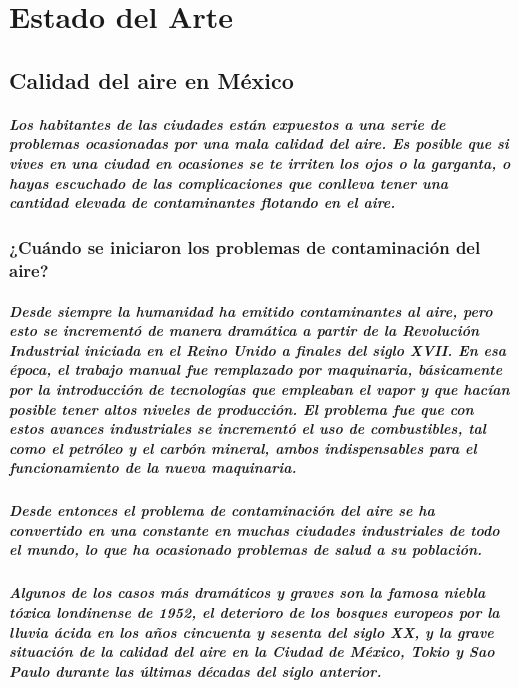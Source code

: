 \chapter {Estado del Arte}
  \section {Calidad del aire en México}
    \paragraph {Los habitantes de las ciudades están expuestos a una serie de problemas ocasionadas por una mala calidad del aire. Es posible que si vives en una ciudad en  ocasiones se te irriten los ojos o la garganta, o hayas escuchado de las complicaciones que conlleva tener una cantidad elevada de contaminantes flotando en el aire.}

    \subsection{¿Cuándo se iniciaron los problemas de contaminación del aire?}
    \paragraph {Desde siempre la humanidad ha emitido contaminantes al aire, pero esto se incrementó de manera dramática a partir de la Revolución Industrial iniciada en el Reino Unido a finales del siglo XVII. En esa época, el trabajo manual fue remplazado por maquinaria, básicamente por la introducción de tecnologías que empleaban el vapor y que hacían posible tener altos niveles de producción. El problema fue que con estos avances industriales se incrementó el  uso de combustibles, tal como el petróleo y el carbón mineral, ambos indispensables para el funcionamiento de la nueva maquinaria.}

    \paragraph {Desde entonces el problema de contaminación del aire se ha convertido en una constante en muchas ciudades industriales de todo el mundo, lo que ha ocasionado problemas de salud a su población.}

    \paragraph {Algunos de los casos más dramáticos y graves son la famosa niebla tóxica londinense de 1952, el deterioro de los bosques europeos por la lluvia ácida en los años cincuenta y sesenta del siglo XX, y la grave situación de la calidad del aire en la Ciudad de México, Tokio y Sao Paulo durante las últimas décadas del siglo anterior. }

